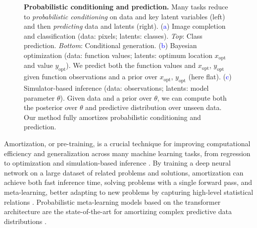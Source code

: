 \documentclass[twoside]{article}
\begin{document}
\begin{figure}[h!]
        
    \caption{\textbf{Probabilistic conditioning and prediction.} Many tasks reduce to \emph{probabilistic conditioning} on data and key latent variables (left) and then \emph{predicting} data and latents (right). (\textcolor{blue}{a}) Image completion and classification (data: pixels; latents: classes). \emph{Top}: Class prediction. \emph{Bottom}: Conditional generation. (\textcolor{blue}{b}) Bayesian optimization (data: function values; latents: optimum location $x_\text{opt}$ and value $y_\text{opt}$). We predict both the function values and $x_\text{opt}$, $y_\text{opt}$ given function observations and a prior over $x_\text{opt}$, $y_\text{opt}$ (here flat). (\textcolor{blue}{c}) Simulator-based inference (data: observations; latents: model parameter $\theta$). Given data and a prior over $\theta$, we can compute both the posterior over $\theta$ and predictive distribution over unseen data.
    Our method fully amortizes probabilistic conditioning and prediction.}
    \label{fig:intro}
    \vspace{-0.3cm}
\end{figure}


Amortization, or pre-training, is a crucial technique for improving computational efficiency and generalization across many machine learning tasks, from regression \citep{garnelo2018neural} to optimization \citep{amos2022tutorial} and simulation-based inference \citep{cranmer2020frontier}. By training a deep neural network on a large dataset of related problems and solutions, amortization can achieve both fast inference time, solving problems with a single forward pass, and meta-learning, better adapting to new problems by capturing high-level statistical relations \citep{brown2020language}. 
Probabilistic meta-learning models based on the transformer architecture \citep{vaswani2017attention} are the state-of-the-art for amortizing complex predictive data distributions \citep{nguyen2022transformer, muller2022transformers}. 
\end{document}
